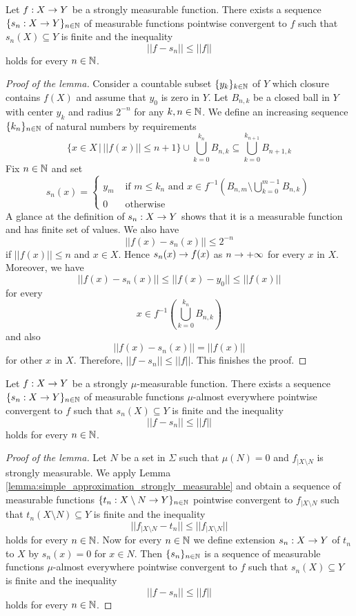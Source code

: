 \begin{lemma}\label{lemma:simple_approximation_strongly_measurable}
Let $f:X\rightarrow Y$ be a strongly measurable function. There exists a sequence $\{s_n:X\rightarrow Y\}_{n\in {\mathbb N}}$ of measurable functions pointwise convergent to $f$ such that $s_n(X)\subseteq Y$ is finite and the inequality
$$||f - s_n||\leq ||f||$$
holds for every $n\in {\mathbb N}$.
\end{lemma}
\begin{proof}[Proof of the lemma]
Consider a countable subset $\{y_k\}_{k\in {\mathbb N}}$ of $Y$ which closure contains $f(X)$ and assume that $y_0$ is zero in $Y$. Let $B_{n,k}$ be a closed ball in $Y$ with center $y_k$ and radius $2^{-n}$ for any $k,n\in {\mathbb N}$. We define an increasing sequence $\{k_n\}_{n\in {\mathbb N}}$ of natural numbers by requirements
$$\big\{x \in X\,\big|\,||f(x)||\leq n+1\big\} \cup \bigcup_{k=0}^{k_n}B_{n, k}\subseteq \bigcup_{k=0}^{k_{n+1}}B_{n+1, k}$$
Fix $n\in {\mathbb N}$ and set
$$s_n(x) = \begin{cases}
y_m & \mbox{ if }m\leq k_n\mbox{ and }x\in f^{-1}\left(B_{n, m}\setminus \bigcup_{k=0}^{m-1}B_{n, k}\right)\\
0 & \mbox{ otherwise}
\end{cases}$$
A glance at the definition of $s_n:X\rightarrow Y$ shows that it is a measurable function and has finite set of values. We also have
$$||f(x) - s_n(x)||\leq 2^{-n}$$
if $||f(x)||\leq n$ and $x \in X$. Hence $s_n(x) \rightarrow f(x)$ as $n\rightarrow +\infty$ for every $x$ in $X$. Moreover, we have
$$||f(x) - s_n(x)||\leq ||f(x) - y_0||\leq ||f(x)||$$
for every
$$x\in f^{-1}\left(\bigcup_{k=0}^{k_n}B_{n,k}\right)$$
and also
$$||f(x) - s_n(x)|| = ||f(x)||$$
for other $x$ in $X$. Therefore, $||f - s_n||\leq ||f||$. This finishes the proof.
\end{proof}

\begin{lemma}\label{lemma:simple_approximation_mu_strongly_measurable}
Let $f:X\rightarrow Y$ be a strongly $\mu$-measurable function. There exists a sequence $\{s_n:X\rightarrow Y\}_{n\in {\mathbb N}}$ of measurable functions $\mu$-almost everywhere pointwise convergent to $f$ such that $s_n(X)\subseteq Y$ is finite and the inequality
$$||f - s_n||\leq ||f||$$
holds for every $n\in {\mathbb N}$.
\end{lemma}
\begin{proof}[Proof of the lemma]
Let $N$ be a set in $\Sigma$ such that $\mu(N) = 0$ and $f_{\mid X\setminus N}$ is strongly measurable. We apply Lemma \ref{lemma:simple_approximation_strongly_measurable} and obtain a sequence of measurable functions $\{t_n:X\setminus N\rightarrow Y\}_{n\in {\mathbb N}}$ pointwise convergent to $f_{\mid X\setminus N}$ such that $t_n(X\setminus N)\subseteq Y$ is finite and the inequality
$$||f_{\mid X\setminus N} - t_n||\leq ||f_{\mid X\setminus N}||$$
holds for every $n\in {\mathbb N}$. Now for every $n\in {\mathbb N}$ we define extension $s_n:X\rightarrow Y$ of $t_n$ to $X$ by $s_n(x) = 0$ for $x\in N$. Then $\{s_n\}_{n\in {\mathbb N}}$ is a sequence of measurable functions $\mu$-almost everywhere pointwise convergent to $f$ such that $s_n(X)\subseteq Y$ is finite and the inequality
$$||f - s_n||\leq ||f||$$
holds for every $n\in {\mathbb N}$.
\end{proof}

